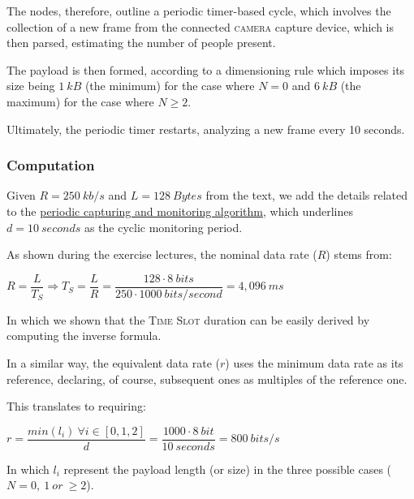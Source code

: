 \documentclass[a4paper,11pt]{article} %
\begin{document}
\smallskip

The nodes, therefore, outline a periodic timer-based cycle, which involves the collection of a new frame from the connected \textsc{camera} capture device, which is then parsed, estimating the number of people present.

\smallskip

The payload is then formed, according to a dimensioning rule which imposes its size being $1\ kB$ (the minimum) for the case where $N = 0$ and $6\ kB$ (the maximum) for the case where $N \geq 2$.

\smallskip

Ultimately, the periodic timer restarts, analyzing a new frame every 10 seconds.

\subsubsection{Computation}

Given $R = 250\ kb/s$ and $L = 128\ Bytes$ from the text, we add the details related to the \hyperref[pseudocode-analysis]{periodic capturing and monitoring algorithm}, which underlines $d = 10\ seconds$ as the cyclic monitoring period.

\medskip

As shown during the exercise lectures, the nominal data rate ($R$) stems from:

\medskip

$R = \dfrac{L}{T_S} \Rightarrow T_S = \dfrac{L}{R} = \dfrac{128 \cdot 8\ bits}{250 \cdot 1000\ bits/second} = 4,096\ ms$

\medskip

In which we shown that the \textsc{Time Slot} duration can be easily derived by computing the inverse formula.

\medskip

In a similar way, the equivalent data rate ($r$) uses the minimum data rate as its reference, declaring, of course, subsequent ones as multiples of the reference one.

\smallskip

This translates to requiring:

\medskip

$r = \dfrac{min(l_i)\ \forall i \in [0, 1, 2]}{d} = \dfrac{1000 \cdot 8\ bit}{10\ seconds} = 800\ bits/s$

\medskip

In which $l_i$ represent the payload length (or size) in the three possible cases ($N = 0,\ 1\ or\ \geq 2$).
\end{document}
